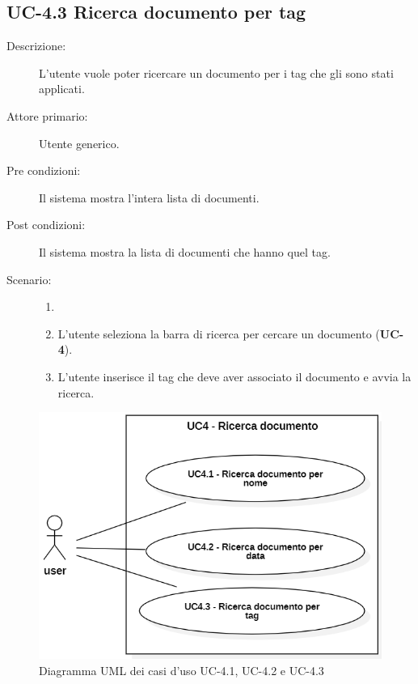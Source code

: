 \subsection{UC-4.3 Ricerca documento per tag}
\begin{description}
    \item[Descrizione:] L’utente vuole poter ricercare un documento per i tag che gli sono stati applicati.
    \item[Attore primario:] Utente generico.
    \item[Pre condizioni:] Il sistema mostra l’intera lista di documenti.
    \item[Post condizioni:] Il sistema mostra la lista di documenti che hanno quel tag.
    \item[Scenario:] 
    \begin{enumerate}
        \item[]
        \item L’utente seleziona la barra di ricerca per cercare un documento (\textbf{UC-4}).
        \item L’utente inserisce il tag che deve aver associato il documento e avvia la ricerca.
    \end{enumerate}
\end{description}

\begin{figure}[H]
    \centering
    \includegraphics[width=0.8\linewidth]{UC4.1.PNG} %
    \caption{Diagramma UML dei casi d'uso UC-4.1, UC-4.2 e UC-4.3}
    \label{fig:UC4.1-2-3}
\end{figure}

